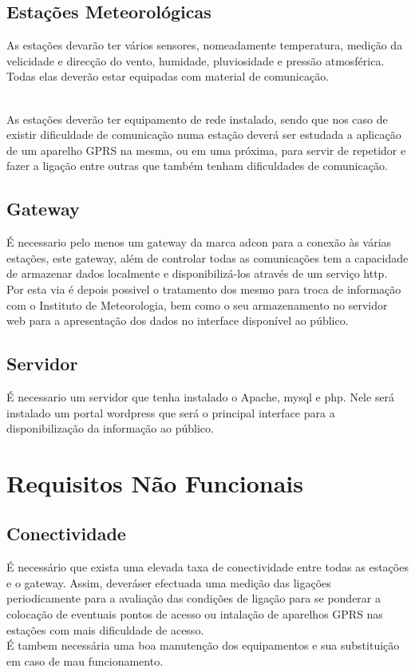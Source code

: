 	\subsection{Estações Meteorológicas}
	As estações devarão ter vários sensores, nomeadamente temperatura, medição da velicidade e direcção do vento, humidade, pluviosidade e pressão atmosférica.
	Todas elas deverão estar equipadas com material de comunicação.

	\\As estações deverão ter equipamento de rede instalado, sendo que nos caso de existir dificuldade de comunicação numa estação deverá ser estudada a aplicação de um aparelho GPRS na mesma, ou em uma próxima, para servir de repetidor e fazer a ligação entre outras que também tenham dificuldades de comunicação.
	\subsection{Gateway}
	É necessario pelo menos um gateway da marca adcon para a conexão às várias estações, este gateway, além de controlar todas as comunicações tem a capacidade de armazenar dados localmente e disponibilizá-los através de um serviço http.
\\Por esta via é depois possivel o tratamento dos mesmo para troca de informação com o Instituto de Meteorologia, bem como o seu armazenamento no servidor web para a apresentação dos dados no interface disponível ao público.

	\subsection{Servidor}
	É necessario um servidor que tenha instalado o Apache, mysql e php. Nele será instalado um portal wordpress que será o principal interface para a disponibilização da informação ao público.


\section{Requisitos Não Funcionais}
	\subsection{Conectividade}
	É necessário que exista uma elevada taxa de conectividade entre todas as estações e o gateway. Assim, deveráser efectuada uma medição das ligações periodicamente para a avaliação das condições de ligação para se ponderar a colocação de eventuais pontos de acesso ou intalação de aparelhos GPRS nas estações com mais dificuldade de acesso.
\\É tambem necessária uma boa manutenção dos equipamentos e sua substituição em caso de mau funcionamento.

